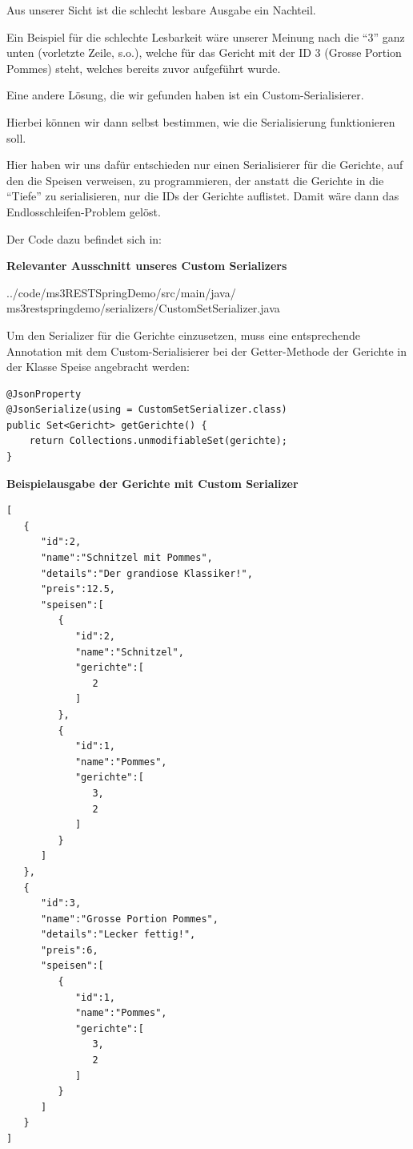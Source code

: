 Aus unserer Sicht ist die schlecht lesbare Ausgabe ein
Nachteil.

Ein Beispiel f\"ur die schlechte Lesbarkeit w\"are unserer
Meinung nach die "`3"' ganz unten (vorletzte Zeile, s.o.),
welche f\"ur das Gericht mit der ID 3 (Grosse Portion
Pommes) steht, welches bereits zuvor aufgef\"uhrt wurde.

Eine andere L\"osung, die wir gefunden haben ist ein
Custom-Serialisierer.

Hierbei k\"onnen wir dann selbst bestimmen, wie die
Serialisierung funktionieren soll.

Hier haben wir uns dafür entschieden nur einen
Serialisierer für die Gerichte, auf den die Speisen
verweisen, zu programmieren, der anstatt die Gerichte in
die "`Tiefe"' zu serialisieren, nur die IDs der Gerichte
auflistet. Damit w\"are dann das Endlosschleifen-Problem
gel\"ost.

Der Code dazu befindet sich in:
\begin{mdframed}[style=codebox]
\textbf{Relevanter Ausschnitt unseres Custom Serializers}

{%
  ../code/ms3RESTSpringDemo/src/main/java/%
  ms3restspringdemo/serializers/CustomSetSerializer.java
}
\end{mdframed}

Um den Serializer für die Gerichte einzusetzen, muss eine
entsprechende Annotation mit dem Custom-Serialisierer bei
der Getter-Methode der Gerichte in der Klasse Speise
angebracht werden:

\begin{mdframed}[style=codebox]
\begin{lstlisting}
@JsonProperty
@JsonSerialize(using = CustomSetSerializer.class)
public Set<Gericht> getGerichte() {
	return Collections.unmodifiableSet(gerichte);
}
\end{lstlisting}
\end{mdframed}

\begin{mdframed}[style=codebox]
\textbf{Beispielausgabe der Gerichte mit Custom Serializer}
\begin{lstlisting}
[
   {
      "id":2,
      "name":"Schnitzel mit Pommes",
      "details":"Der grandiose Klassiker!",
      "preis":12.5,
      "speisen":[
         {
            "id":2,
            "name":"Schnitzel",
            "gerichte":[
               2
            ]
         },
         {
            "id":1,
            "name":"Pommes",
            "gerichte":[
               3,
               2
            ]
         }
      ]
   },
   {
      "id":3,
      "name":"Grosse Portion Pommes",
      "details":"Lecker fettig!",
      "preis":6,
      "speisen":[
         {
            "id":1,
            "name":"Pommes",
            "gerichte":[
               3,
               2
            ]
         }
      ]
   }
]
\end{lstlisting}
\end{mdframed}

